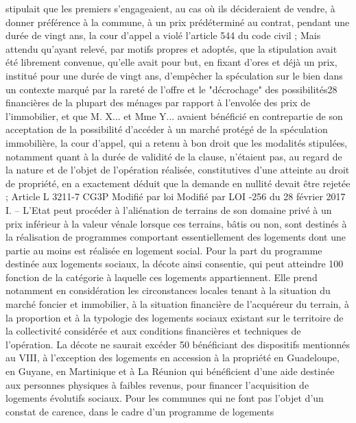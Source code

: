 \documentclass[11pt,a4paper]{report}
\begin{document}
	stipulait que les premiers s'engageaient, au cas où ils décideraient de vendre, à donner préférence à la
	commune, à un prix prédéterminé au contrat, pendant une durée de vingt ans, la cour d'appel a violé l'article
	544 du code civil ;
	Mais attendu qu'ayant relevé, par motifs propres et adoptés, que la stipulation avait été librement convenue,
	qu'elle avait pour but, en fixant d'ores et déjà un prix, institué pour une durée de vingt ans, d'empêcher la
	spéculation sur le bien dans un contexte marqué par la rareté de l'offre et le "décrochage" des possibilités28
	financières de la plupart des ménages par rapport à l'envolée des prix de l'immobilier, et que M. X... et Mme Y...
	avaient bénéficié en contrepartie de son acceptation de la possibilité d'accéder à un marché protégé de la
	spéculation immobilière, la cour d'appel, qui a retenu à bon droit que les modalités stipulées, notamment quant
	à la durée de validité de la clause, n'étaient pas, au regard de la nature et de l'objet de l'opération réalisée,
	constitutives d'une atteinte au droit de propriété, en a exactement déduit que la demande en nullité devait être
	rejetée ;
	Article L 3211-7 CG3P Modifié par loi Modifié par LOI -256 du 28 février 2017
	I. – L'Etat peut procéder à l'aliénation de terrains de son domaine privé à un prix inférieur à la valeur vénale
	lorsque ces terrains, bâtis ou non, sont destinés à la réalisation de programmes comportant essentiellement des
	logements dont une partie au moins est réalisée en logement social. Pour la part du programme destinée aux
	logements sociaux, la décote ainsi consentie, qui peut atteindre 100 %
	fonction de la catégorie à laquelle ces logements appartiennent. Elle prend notamment en considération les
	circonstances locales tenant à la situation du marché foncier et immobilier, à la situation financière de
	l'acquéreur du terrain, à la proportion et à la typologie des logements sociaux existant sur le territoire de la
	collectivité considérée et aux conditions financières et techniques de l'opération. La décote ne saurait excéder
	50 %
	bénéficiant des dispositifs mentionnés au VIII, à l'exception des logements en accession à la propriété en
	Guadeloupe, en Guyane, en Martinique et à La Réunion qui bénéficient d'une aide destinée aux personnes
	physiques à faibles revenus, pour financer l'acquisition de logements évolutifs sociaux.
	Pour les communes qui ne font pas l'objet d'un constat de carence, dans le cadre d'un programme de logements
\end{document}
